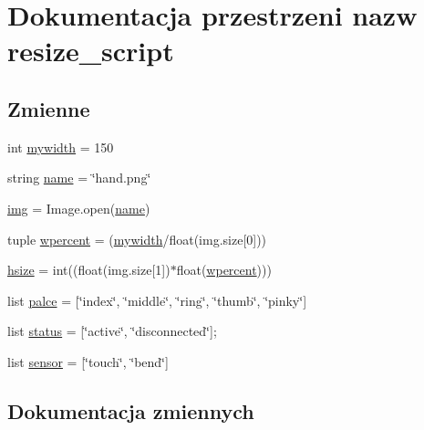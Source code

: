 \hypertarget{namespaceresize__script}{}\section{Dokumentacja przestrzeni nazw resize\+\_\+script}
\label{namespaceresize__script}
\subsection*{Zmienne}
\begin{DoxyCompactItemize}
\item 
int \hyperlink{namespaceresize__script_ae7ea66b65845ff6b9478a056a4a33c5a}{mywidth} = 150
\item 
string \hyperlink{namespaceresize__script_aac9c9cf9b8d89c7b8f9634beed5e1ff4}{name} = \char`\"{}hand.\+png\char`\"{}
\item 
\hyperlink{namespaceresize__script_abdb2b972c6c1f9e70d543a0a16e25463}{img} = Image.\+open(\hyperlink{namespaceresize__script_aac9c9cf9b8d89c7b8f9634beed5e1ff4}{name})
\item 
tuple \hyperlink{namespaceresize__script_a19164b83e4fc883571c218bdc59c3796}{wpercent} = (\hyperlink{namespaceresize__script_ae7ea66b65845ff6b9478a056a4a33c5a}{mywidth}/float(img.\+size\mbox{[}0\mbox{]}))
\item 
\hyperlink{namespaceresize__script_a51a5f5ec3dcaae321e76c4b8f46f6134}{hsize} = int((float(img.\+size\mbox{[}1\mbox{]})$\ast$float(\hyperlink{namespaceresize__script_a19164b83e4fc883571c218bdc59c3796}{wpercent})))
\item 
list \hyperlink{namespaceresize__script_a5ee40d78c225215ab3915db1fbd7e83f}{palce} = \mbox{[}\char`\"{}index\char`\"{}, \char`\"{}middle\char`\"{}, \char`\"{}ring\char`\"{}, \char`\"{}thumb\char`\"{}, \char`\"{}pinky\char`\"{}\mbox{]}
\item 
list \hyperlink{namespaceresize__script_a0988989e1e7bc7ece1be39f8d52beaa9}{status} = \mbox{[}\char`\"{}active\char`\"{}, \char`\"{}disconnected\char`\"{}\mbox{]};
\item 
list \hyperlink{namespaceresize__script_a66105bd89de1722c111fceca24ab88c1}{sensor} = \mbox{[}\char`\"{}touch\char`\"{}, \char`\"{}bend\char`\"{}\mbox{]}
\end{DoxyCompactItemize}


\subsection{Dokumentacja zmiennych}
